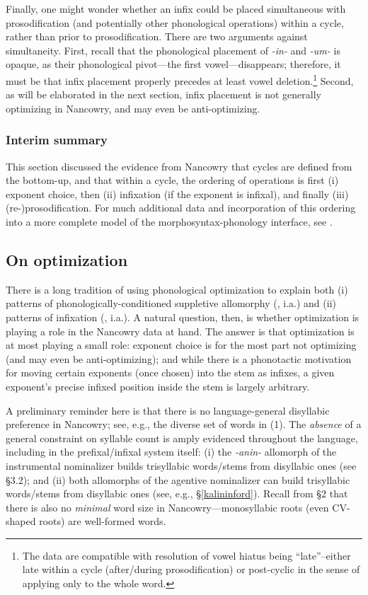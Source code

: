 \documentclass[output=paper,colorlinks,citecolor=brown,
]{langscibook}
\begin{document}
Finally, one might wonder whether an infix could be placed simultaneous with prosodification (and potentially other phonological operations) within a cycle, rather than prior to prosodification. There are two arguments against simultaneity. First, recall that the phonological placement of \textit{-in-} and \textit{-um-} is opaque, as their phonological pivot---the first vowel---disappears; therefore, it must be that infix placement properly precedes at least vowel deletion.\footnote{The data are compatible with resolution of vowel hiatus being ``late''--either late within a cycle (after/during prosodification) or post-cyclic in the sense of applying only to the whole word.} Second, as will be elaborated in the next section, infix placement is not generally optimizing in Nancowry, and may even be anti-optimizing.

\subsubsection{Interim summary}

This section discussed the evidence from Nancowry that cycles are defined from the bottom-up, and that within a cycle, the ordering of operations is first (i) exponent choice, then (ii) infixation (if the exponent is infixal), and finally (iii) (re-)prosodification. For much additional data and incorporation of this ordering into a more complete model of the morphosyntax-phonology interface, see \citealt{KalinIP}.

\subsection{On optimization}\label{kalinopt}

There is a long tradition of using phonological optimization to explain both (i) patterns of phonologically-conditioned suppletive allomorphy (\citealt{MP93a,Mester94,Kager96,Mascaro96,Mascaro07,Wolf08,Kim10}, i.a.) and (ii) patterns of infixation (\citealt{MP93a,HI97,Horwood02,Wolf08}, i.a.). A natural question, then, is whether optimization is playing a role in the Nancowry data at hand. The answer is that optimization is at most playing a small role: exponent choice is for the most part not optimizing (and may even be anti-optimizing); and while there is a phonotactic motivation for moving certain exponents (once chosen) into the stem as infixes, a given exponent's precise infixed position inside the stem is largely arbitrary.

A preliminary reminder here is that there is no language-general disyllabic preference in Nancowry; see, e.g., the diverse set of words in (1). The {\it absence} of a general constraint on syllable count is amply evidenced throughout the language, including in the prefixal/infixal system itself: (i) the \textit{-anin-} allomorph of the instrumental nominalizer builds trisyllabic words/stems from disyllabic ones (see \S3.2); and (ii) both allomorphs of the agentive nominalizer can build trisyllabic words/stems from disyllabic ones (see, e.g., \S\ref{kalininford}). Recall from \S2 that there is also no {\it minimal} word size in Nancowry---monosyllabic roots (even CV-shaped roots) are well-formed words. 
\end{document}
